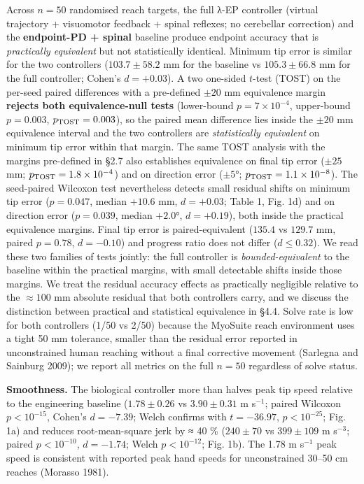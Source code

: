 \documentclass[
  11pt,
]{article}
\begin{document}
Across \(n = 50\) randomised reach targets, the full λ-EP controller
(virtual trajectory + visuomotor feedback + spinal reflexes; no
cerebellar correction) and the \textbf{endpoint-PD + spinal} baseline
produce endpoint accuracy that is \emph{practically equivalent} but not
statistically identical. Minimum tip error is similar for the two
controllers (\(103.7 \pm 58.2\) mm for the baseline vs
\(105.3 \pm 66.8\) mm for the full controller; Cohen's \(d = +0.03\)). A
two one-sided \(t\)-test (TOST) on the per-seed paired differences with
a pre-defined \(\pm 20\) mm equivalence margin \textbf{rejects both
equivalence-null tests} (lower-bound \(p = 7 \times 10^{-4}\),
upper-bound \(p = 0.003\), \(p_{\rm TOST} = 0.003\)), so the paired mean
difference lies inside the \(\pm 20\) mm equivalence interval and the
two controllers are \emph{statistically equivalent} on minimum tip error
within that margin. The same TOST analysis with the margins pre-defined
in §2.7 also establishes equivalence on final tip error (\(\pm 25\) mm;
\(p_{\rm TOST} = 1.8 \times 10^{-4}\)) and on direction error
(\(\pm 5°\); \(p_{\rm TOST} = 1.1 \times 10^{-8}\)). The seed-paired
Wilcoxon test nevertheless detects small residual shifts on minimum tip
error (\(p = 0.047\), median \(+10.6\) mm, \(d = +0.03\); Table 1, Fig.
1d) and on direction error (\(p = 0.039\), median \(+2.0°\),
\(d = +0.19\)), both inside the practical equivalence margins. Final tip
error is paired-equivalent (\(135.4\) vs \(129.7\) mm, paired
\(p = 0.78\), \(d = -0.10\)) and progress ratio does not differ
(\(d \le 0.32\)). We read these two families of tests jointly: the full
controller is \emph{bounded-equivalent} to the baseline within the
practical margins, with small detectable shifts inside those margins. We
treat the residual accuracy effects as practically negligible relative
to the \(\approx 100\) mm absolute residual that both controllers carry,
and we discuss the distinction between practical and statistical
equivalence in §4.4. Solve rate is low for both controllers (1/50 vs
2/50) because the MyoSuite reach environment uses a tight 50 mm
tolerance, smaller than the residual error reported in unconstrained
human reaching without a final corrective movement (Sarlegna and
Sainburg 2009); we report all metrics on the full \(n = 50\) regardless
of solve status.

\textbf{Smoothness.} The biological controller more than halves peak tip
speed relative to the engineering baseline (\(1.78 \pm 0.26\) vs
\(3.90 \pm 0.31\) m s\(^{-1}\); paired Wilcoxon \(p < 10^{-15}\),
Cohen's \(d = -7.39\); Welch confirms with \(t = -36.97\),
\(p < 10^{-25}\); Fig. 1a) and reduces root-mean-square jerk by ≈ 40 \%
(\(240 \pm 70\) vs \(399 \pm 109\) m s\(^{-3}\); paired
\(p < 10^{-10}\), \(d = -1.74\); Welch \(p < 10^{-12}\); Fig. 1b). The
1.78 m s\(^{-1}\) peak speed is consistent with reported peak hand
speeds for unconstrained 30--50 cm reaches (Morasso 1981).
\end{document}
